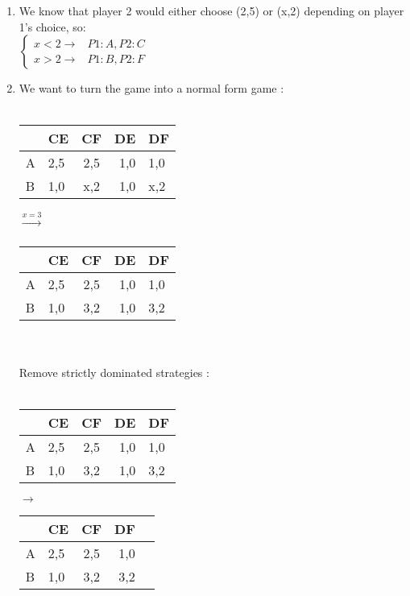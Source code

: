 \begin{enumerate}
\item \phantom{text}
\begin{latin}
  We know that player 2 would either choose (2,5) or (x,2) depending on player 1's choice, so: \\
  $
    \begin{cases}
      x < 2  \rightarrow 
       & P1 : A,P2 : C
      \\[1ex]
      x > 2  \rightarrow 
       & P1 : B, P2 : F
    \end{cases}
  $
\end{latin}
\item \phantom{text}
\begin{latin}
We want to turn the game into a normal form game : \\\\
\begin{tabular}{l | l | c | r | l | }
    & CE  & CF  & DE  & DF  \\
  \hline
  A & 2,5 & 2,5 & 1,0 & 1,0 \\
  \hline
  B & 1,0 & x,2 & 1,0 & x,2 \\
  \hline
\end{tabular}
$\xrightarrow[]{x=3}$
  \begin{tabular}{l | l | c | r | l | }
      & CE  & CF  & DE  & DF  \\
    \hline
    A & 2,5 & 2,5 & 1,0 & 1,0 \\
    \hline
    B & 1,0 & 3,2 & 1,0 & 3,2 \\
    \hline
  \end{tabular}
  \\\\
  Remove strictly dominated strategies :
   \\\\
  \begin{tabular}{l | l | c | r | l | }
    & CE  & CF  & DE  & DF  \\
  \hline
  A & 2,5 & 2,5 & 1,0 & 1,0 \\
  \hline
  B & 1,0 & 3,2 & 1,0 & 3,2 \\
  \hline
\end{tabular}
$\rightarrow$
\begin{tabular}{l | l | c | r | l | }
  & CE  & CF   & DF  \\
\hline
A & 2,5 & 2,5 & 1,0 \\
\hline
B & 1,0 & 3,2 & 3,2 \\
\hline
\end{tabular}

\end{latin}
\end{enumerate}
